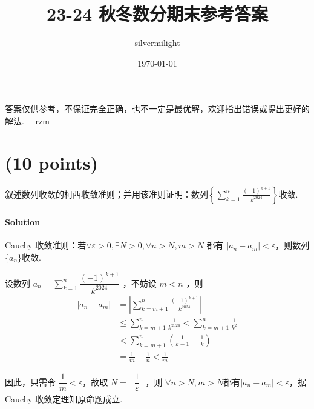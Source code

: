 \documentclass{ctexart}
\title{23-24 秋冬数分期末参考答案}
\author{silvermilight}
\date{\today}
\begin{document}
\maketitle

答案仅供参考，不保证完全正确，也不一定是最优解，欢迎指出错误或提出更好的解法. ---rzm

\section{(10 points)}
    叙述数列收敛的柯西收敛准则；并用该准则证明：数列$\displaystyle\left\{\sum_{k=1}^n \frac{(-1)^{k+1}}{k^{2024}}\right\}$收敛.
\paragraph{Solution}
    Cauchy 收敛准则：若$\forall\varepsilon>0,\exists N>0,\forall n>N,m>N $ 都有 $|a_n-a_m|<\varepsilon$，则数列$\{a_n\}$收敛.

    设数列 $a_n=\displaystyle\sum_{k=1}^n \dfrac{(-1)^{k+1}}{k^{2024}}$ ，不妨设 $m<n$ ，则
    \begin{align*}
        |a_n-a_m| &= \left| \sum_{k=m+1}^n \frac{(-1)^{k+1}}{k^{2024}} \right| \\
                    & \leqslant \sum_{k=m+1}^n \frac{1}{k^{2024}} < \sum_{k=m+1}^n \frac{1}{k^2} \\
                    & < \sum_{k=m+1}^n \left( \frac{1}{k-1}-\frac{1}{k} \right) \\
                    & = \frac{1}{m}-\frac{1}{n} < \frac{1}{m}
    \end{align*}

    因此，只需令 $\dfrac{1}{m}<\varepsilon$，故取 $N=\left\lfloor \dfrac{1}{\varepsilon} \right\rfloor$，则 $\forall n>N,m>N$都有$|a_n-a_m|<\varepsilon$，据 Cauchy 收敛定理知原命题成立.
\end{document}
